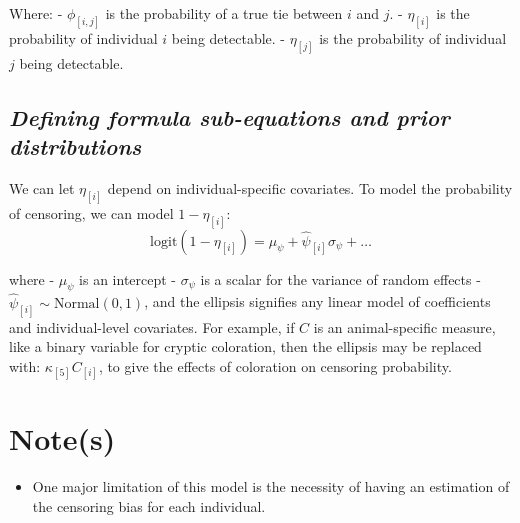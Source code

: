 \documentclass[
  letterpaper,
  DIV=11,
  numbers=noendperiod]{scrreprt}
\providecommand{\tightlist}{%
  \setlength{\itemsep}{0pt}\setlength{\parskip}{0pt}}\usepackage{longtable,booktabs,array}
\begin{document}
Where: - \(\phi_{[i,j]}\) is the probability of a true tie between \(i\)
and \(j\). - \(\eta_{[i]}\) is the probability of individual \(i\) being
detectable. - \(\eta_{[j]}\) is the probability of individual \(j\)
being detectable.

\subsection{\texorpdfstring{\emph{Defining formula sub-equations and
prior
distributions}}{Defining formula sub-equations and prior distributions}}\label{defining-formula-sub-equations-and-prior-distributions-2}

We can let \(\eta_{[i]}\) depend on individual-specific covariates. To
model the probability of censoring, we can model \(1-\eta_{[i]}\): \[
\text{logit}(1-\eta_{[i]}) = \mu_\psi + \hat\psi_{[i]}  \sigma_\psi + \ldots 
\]

where - \(\mu_\psi\) is an intercept - \(\sigma_\psi\) is a scalar for
the variance of random effects -
\(\hat\psi_{[i]}\sim \text {Normal}(0,1)\), and the ellipsis signifies
any linear model of coefficients and individual-level covariates. For
example, if \(C\) is an animal-specific measure, like a binary variable
for cryptic coloration, then the ellipsis may be replaced with:
\(\kappa_{[5]}C_{[i]}\), to give the effects of coloration on censoring
probability.

\section{Note(s)}\label{notes-11}

\begin{tcolorbox}[enhanced jigsaw, toptitle=1mm, opacityback=0, titlerule=0mm, breakable, bottomrule=.15mm, colframe=quarto-callout-note-color-frame, arc=.35mm, coltitle=black, left=2mm, opacitybacktitle=0.6, leftrule=.75mm, toprule=.15mm, rightrule=.15mm, bottomtitle=1mm, colbacktitle=quarto-callout-note-color!10!white, title=\textcolor{quarto-callout-note-color}{\faInfo}\hspace{0.5em}{Note}, colback=white]

\begin{itemize}
\tightlist
\item
  One major limitation of this model is the necessity of having an
  estimation of the censoring bias for each individual.
\end{itemize}

\end{tcolorbox}
\end{document}
